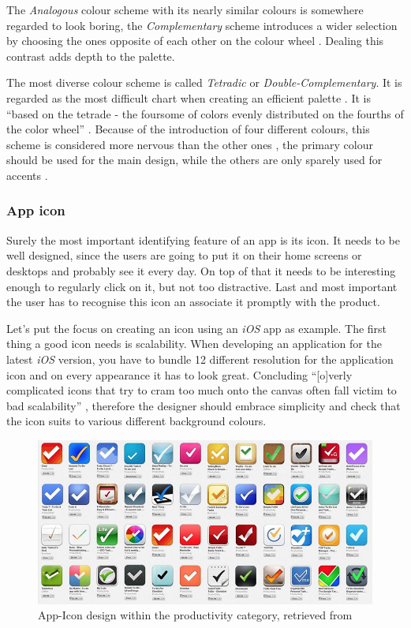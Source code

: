 The \emph{Analogous} colour scheme with its nearly similar colours is somewhere regarded to look boring, the \emph{Complementary} scheme introduces a wider selection by choosing the ones opposite of each other on the colour wheel \cite{Chapman:2010ab}. Dealing this contrast adds depth to the palette.

The most diverse colour scheme is called \emph{Tetradic} or \emph{Double-Complementary}. It is regarded as the most difficult chart when creating an efficient palette \cite{Chapman:2010ab}. It is \enquote{based on the tetrade - the foursome of colors evenly distributed on the fourths of the color wheel} \cite{Stanicek:2011aa}. Because of the introduction of four different colours, this scheme is considered more nervous than the other ones \cite{Stanicek:2011aa}, the primary colour should be used for the main design, while the others are only sparely used for accents \cite{Chapman:2010ab}.

\subsubsection{App icon}
\label{sec:Icon}
Surely the most important identifying feature of an app is its icon. It needs to be well designed, since the users are going to put it on their home screens or desktops and probably see it every day. On top of that it needs to be interesting enough to regularly click on it, but not too distractive. Last and most important the user has to recognise this icon an associate it promptly with the product. \cite{Flarup:2015aa}

Let's put the focus on creating an icon using an \emph{iOS} app as example. The first thing a good icon needs is scalability. When developing an application for the latest \emph{iOS} version, you have to bundle 12 different resolution for the application icon and on every appearance it has to look great. Concluding \enquote{[o]verly complicated icons that try to cram too much onto the canvas often fall victim to bad scalability} \cite{Flarup:2015aa}, therefore the designer should embrace simplicity and check that the icon suits to various different background colours. \cite{Flarup:2015aa}

\begin{figure}[h]
  	\centering
  	\includegraphics[width=0.7\linewidth]{./images/productivity-icons.png}
  	\caption{App-Icon design within the productivity category, retrieved from \cite{Flarup:2015aa}}
	\label{fig:AppProd}
\end{figure}
\nocite{Flarup:2015aa}

